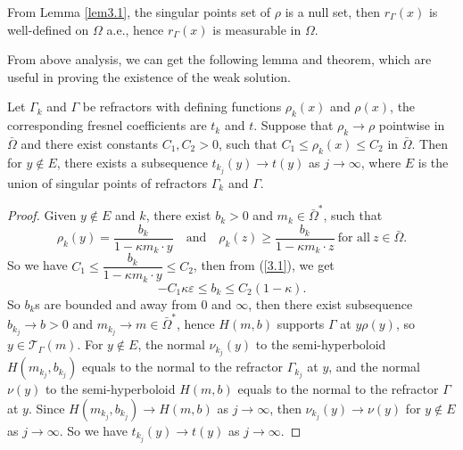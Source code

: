 \documentclass[a4paper,12pt,]{article}
\newtheorem{lemma}{\hskip\parindent\bf Lemma}[section]%
\newtheorem{remark}{\hskip\parindent\bf Remark}[section]%
\numberwithin{equation}{section}
\numberwithin{equation}{section} \allowdisplaybreaks
\begin{document}
\begin{remark}
  From Lemma \ref{lem3.1}, the singular points set of $\rho$ is a null set, then $r_{\Gamma}(x)$ is well-defined on $\Omega$ a.e., hence $r_{\Gamma}(x)$ is measurable in $\Omega$.
  \label{rem3.2}
\end{remark}

From above analysis, we can get the following lemma and theorem, which are useful in proving the existence of the weak solution.

\begin{lemma}
  Let $\Gamma_{k}$ and $\Gamma$ be refractors with defining functions $\rho_{k}(x)$ and $\rho(x)$, the corresponding fresnel coefficients are $t_{k}$ and $t$. Suppose that $\rho_{k}\rightarrow \rho$ pointwise in $\bar{\Omega}$ and there exist constants $C_{1},C_{2}>0$, such that $C_{1} \leq \rho_{k}(x) \leq C_{2}$ in $\bar{\Omega}$. Then for $y \notin E$, there exists a subsequence $t_{k_{j}}(y)\rightarrow t(y)$ as $j\rightarrow \infty$, where $E$ is the union of singular points of refractors $\Gamma_{k}$ and $\Gamma$.
  \label{lem3.7}
\end{lemma}

\begin{proof}
  Given $y \notin E$ and $k$, there exist $b_{k}>0$ and $m_{k} \in \bar{\Omega}^{\ast}$, such that
  $$\rho_{k}(y) = \frac{b_{k}}{1 - \kappa m_{k} \cdot y} \quad \text{and} \quad \rho_{k}(z) \geq \frac{b_{k}}{1 - \kappa m_{k} \cdot z}~\text{for all}~ z\in \bar{\Omega}. $$
  So we have $C_{1} \leq \dfrac{b_{k}}{1 - \kappa m_{k} \cdot y} \leq C_{2}$, then from (\ref{3.1}), we get
  $$-C_{1}\kappa \varepsilon \leq b_{k} \leq C_{2}(1 - \kappa).$$
  So $b_{k}$s are bounded and away from 0 and $\infty$, then there exist subsequence $b_{k_{j}}\rightarrow b >0$ and $m_{k_{j}}\rightarrow m \in \bar{\Omega}^{\ast}$, hence $H(m,b)$ supports $\Gamma$ at $y\rho(y)$, so $y \in \mathcal{T}_{\Gamma}(m)$. For $y \notin E$, the normal $\nu_{k_{j}}(y)$ to the semi-hyperboloid  $H(m_{k_{j}},b_{k_{j}})$ equals to the normal to the refractor $\Gamma_{k_{j}}$ at $y$, and the normal $\nu(y)$ to the semi-hyperboloid $H(m,b)$ equals to the normal to the refractor $\Gamma$ at $y$. Since $H(m_{k_{j}},b_{k_{j}}) \rightarrow H(m,b)$ as $j\rightarrow \infty$, then $\nu_{k_{j}}(y) \rightarrow \nu(y)$ for $y \notin E$ as  $j\rightarrow \infty$. So we have $t_{k_{j}}(y)\rightarrow t(y)$ as $j \rightarrow \infty$.
\end{proof}
\end{document}
